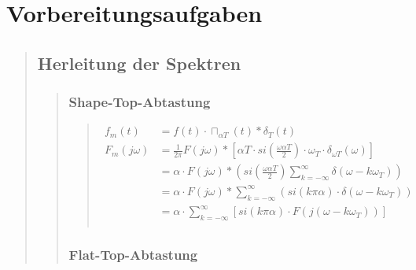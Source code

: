 \section{Vorbereitungsaufgaben}
\begin{quote}
    \hspace{-2em}
    \subsection{Herleitung der Spektren}
    \begin{quote}
        
        \subsubsection{Shape-Top-Abtastung}
        \begin{quote}
            
            
            \begin{equation*}
                \begin{split}
                    f_m (t)   &= f(t) \cdot \sqcap_{\alpha T} (t) \ast \delta_T (t) \\
                    F_m (j\omega) &= \frac{1}{2\pi} F (j\omega) \ast \left [ \alpha T \cdot si \left( \frac{\omega
                    \alpha T}{2} \right) \cdot \omega_T \cdot \delta_{\omega T} (\omega) \right] \\
                    &= \alpha \cdot F (j \omega) \ast \left ( si \left( \frac{\omega \alpha T}{2} \right)
                    \sum_{k=-\infty}^{\infty} \delta (\omega - k\omega_T) \right)\\
                    &= \alpha \cdot F (j \omega) \ast \sum_{k=-\infty}^{\infty} (si(k \pi \alpha) \cdot \delta (\omega -
                    k\omega_T))\\
                    &= \alpha \cdot \sum_{k=-\infty}^{\infty} \left [ si(k \pi \alpha) \cdot F (j(\omega - k\omega_T))
                    \right]\\
                    \label{eq:shape}
                \end{split}
            \end{equation*}
            
            
        \end{quote}
        
        \subsubsection{Flat-Top-Abtastung}
        \begin{quote}
            

\end{quote}
\end{quote}
\end{quote}

